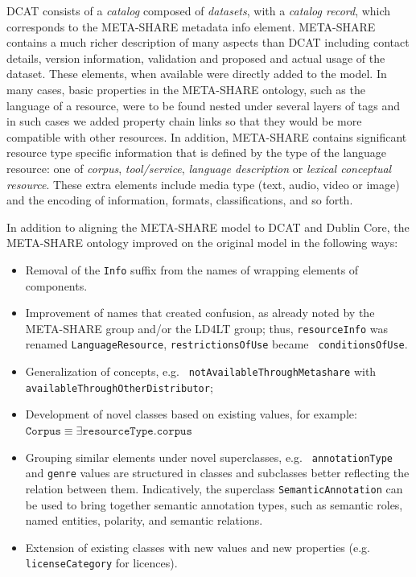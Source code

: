 \documentclass[smallextended]{svjour3}       %
\begin{document}
DCAT consists of a \emph{catalog} composed of \emph{datasets}, with a
\emph{catalog record}, which
corresponds to the META-SHARE metadata info element. META-SHARE contains a much
richer description of many aspects than DCAT including contact details, version
information, validation and proposed and actual usage of the dataset. These
elements, when available were directly added to the model. In many cases, basic
properties in the META-SHARE ontology, such as the language of a resource, were
to be found nested under several layers of tags and in such cases we added
property chain links so that they would be more compatible with other resources.
In addition, META-SHARE contains significant resource type specific information
that is defined by the type of the language resource: one of \emph{corpus},
\emph{tool/service}, \emph{language description} or \emph{lexical conceptual
resource}. These extra elements include media type (text, audio, video or image)
and the encoding of information, formats, classifications, and so forth.

In addition to aligning the META-SHARE model to DCAT and Dublin Core, the
META-SHARE ontology improved on the original model in the following ways:

\begin{itemize}
    \item Removal of the {\tt Info} suffix from the names of  wrapping elements of
        components.
    \item Improvement of names that created confusion, as already noted by the
        META-SHARE group and/or the LD4LT group; thus, {\tt resourceInfo} was renamed
        {\tt LanguageResource}, {\tt restrictionsOfUse} became {\tt
        conditionsOfUse}.
    \item Generalization of concepts, e.g. {\tt
        not\-Available\-Through\-Metashare} with {\tt
        avai\-lable\-Through\-Other\-Distributor};
\item Development of novel classes based on existing values, for example:
    \\$\mathtt{Corpus} \equiv \exists \mathtt{resourceType}.\mathtt{corpus}$
\item Grouping similar elements under novel superclasses, e.g. {\tt
    annotationType} and {\tt genre} values are structured in classes and
    subclasses better reflecting the relation between them. Indicatively, the superclass
    {\tt SemanticAnnotation} can be used to bring together semantic annotation types,
    such as semantic roles, named entities, polarity, and semantic relations.
\item Extension of existing classes with new values and new properties
    (e.g. {\tt licenseCategory} for licences).
\end{itemize}
\end{document}
